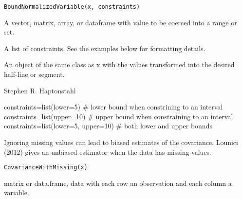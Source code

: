 \documentclass[a4paper]{book}
\begin{document}
%
\begin{Usage}
\begin{verbatim}
BoundNormalizedVariable(x, constraints)
\end{verbatim}
\end{Usage}
%
\begin{Arguments}
\begin{ldescription}
\item[\code{x}] A vector, matrix, array, or dataframe with value to be coerced into a range or set.

\item[\code{constraints}] A list of constraints.  See the examples below for formatting details.
\end{ldescription}
\end{Arguments}
%
\begin{Value}
An object of the same class as x with the values transformed into the desired half-line or segment.
\end{Value}
%
\begin{Author}\relax
Stephen R. Haptonstahl 
\end{Author}
%
\begin{Examples}
\begin{ExampleCode}
  constraints=list(lower=5)           # lower bound when constrining to an interval
  constraints=list(upper=10)          # upper bound when constraining to an interval
  constraints=list(lower=5, upper=10) # both lower and upper bounds
\end{ExampleCode}
\end{Examples}
%
\begin{Description}\relax
Ignoring missing values can lead to biased estimates of the covariance.
Lounici (2012) gives an unbiased estimator when the data has missing values.
\end{Description}
%
\begin{Usage}
\begin{verbatim}
CovarianceWithMissing(x)
\end{verbatim}
\end{Usage}
%
\begin{Arguments}
\begin{ldescription}
\item[\code{x}] matrix or data.frame, data with each row an observation and each column a variable.
\end{ldescription}
\end{Arguments}
\end{document}

